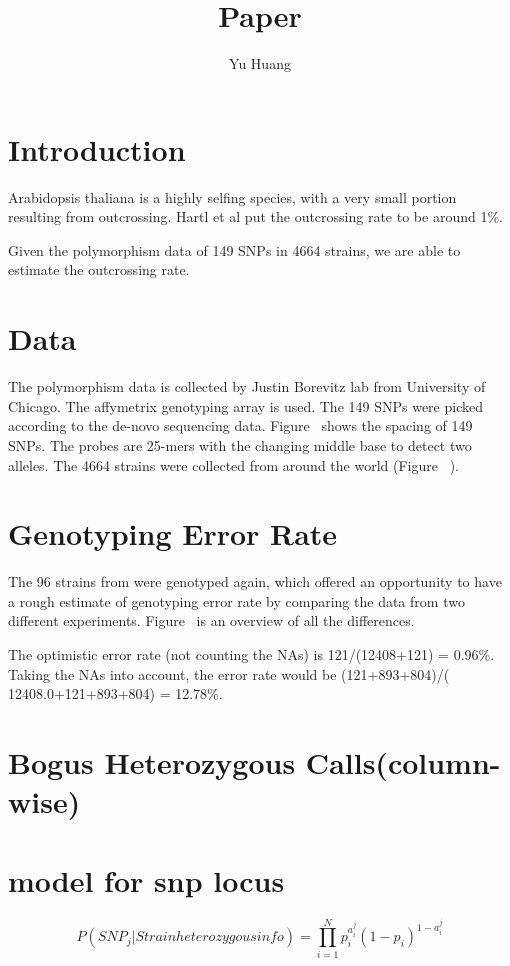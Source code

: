 \documentclass[a4paper,10pt]{article}
\title{Paper}
\author{Yu Huang}
\begin{document}
\maketitle

\begin{abstract}

\end{abstract}

\section{Introduction}
Arabidopsis thaliana is a highly selfing species, with a very small portion resulting from outcrossing. Hartl et al\cite{Hartl2007} put the outcrossing rate to be around 1\%.

Given the polymorphism data of 149 SNPs in 4664 strains, we are able to estimate the outcrossing rate.

\section{Data}
The polymorphism data is collected by Justin Borevitz lab from University of Chicago. The affymetrix genotyping array is used. The 149 SNPs were picked according to the de-novo sequencing data\cite{Nordborg2005}. Figure~ shows the spacing of 149 SNPs. The probes are 25-mers with the changing middle base to detect two alleles. The 4664 strains were collected from around the world (Figure~ ).

\section{Genotyping Error Rate}
The 96 strains from \cite{Nordborg2005} were genotyped again, which offered an opportunity to have a rough estimate of genotyping error rate by comparing the data from two different experiments. Figure~ is an overview of all the differences.

The optimistic error rate (not counting the NAs) is 121/(12408+121) = 0.96\%. Taking the NAs into account, the error rate would be (121+893+804)/( 12408.0+121+893+804) = 12.78\%.


\section{Bogus Heterozygous Calls(column-wise)}


\section{model for snp locus}
\begin{equation}
P({SNP}_j|Strain heterozygous info) = \prod_{i=1}^{N} p_i^{a_i^j} (1-p_i)^{1-a_i^j}
\end{equation}
\end{document}
